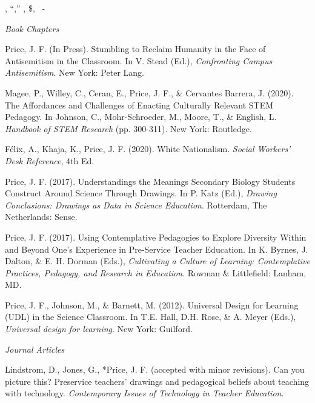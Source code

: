 \documentclass[11pt,article,oneside]{memoir}
\begin{document}


      \ind {}, ``,'' , \$, ~- 



\bigskip

\medskip
\noindent\emph{Book Chapters \vspace{0.01in}}

\ind Price, J. F. (In Press). Stumbling to Reclaim Humanity in the Face of Antisemitism in the Classroom. In V. Stead (Ed.), \textit{Confronting Campus Antisemitism}. New York: Peter Lang.

\ind Magee, P., Willey, C., Ceran, E., Price, J. F., \& Cervantes Barrera, J. (2020). The Affordances and Challenges of Enacting Culturally Relevant STEM Pedagogy. In Johnson, C., Mohr-Schroeder, M., Moore, T., \& English, L. \textit{Handbook of STEM Research} (pp. 300-311). New York: Routledge.

\ind Félix, A., Khaja, K., Price, J. F. (2020). White Nationalism. \textit{Social Workers' Desk Reference}, 4th Ed.

\ind Price, J. F. (2017). Understandings the Meanings Secondary Biology Students Construct Around Science Through Drawings. In P. Katz (Ed.), \textit{Drawing Conclusions: Drawings as Data in Science Education}. Rotterdam, The Netherlands: Sense.

\ind Price, J. F. (2017). Using Contemplative Pedagogies to Explore Diversity Within and Beyond One’s Experience in Pre-Service Teacher Education. In K. Byrnes, J. Dalton, \& E. H. Dorman (Eds.), \textit{Cultivating a Culture of Learning: Contemplative Practices, Pedagogy, and Research in Education}. Rowman \& Littlefield: Lanham, MD.

\ind Price, J. F., Johnson, M., \& Barnett, M. (2012). Universal Design for Learning (UDL) in the Science Classroom. In T.E. Hall, D.H. Rose, \& A. Meyer (Eds.), \textit{Universal design for learning}. New York: Guilford.

\bigskip
\noindent\emph{Journal Articles \vspace{0.05in}}

\ind Lindstrom, D., Jones, G., *Price, J. F. (accepted with minor revisions). Can you picture this? Preservice teachers’ drawings and pedagogical beliefs about teaching with technology. \textit{Contemporary Issues of Technology in Teacher Education}.
\end{document}
